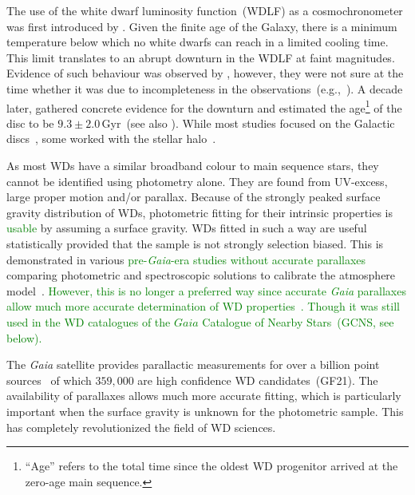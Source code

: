 \documentclass[fleqn,usenatbib]{mnras}
\begin{document}
The use of the white dwarf luminosity function~(WDLF) as a cosmochronometer was
first introduced by \citet{1959ApJ...129..243S}. Given the finite age of the
Galaxy, there is a minimum temperature below which no white dwarfs can reach in
a limited cooling time. This limit translates to an abrupt downturn in the WDLF
at faint magnitudes. Evidence of such behaviour was observed by
\citet{1979ApJ...233..226L}, however, they were not sure at the time whether it
was due to incompleteness in the observations~(e.g.,~\citealp{1984ApJ...282..615I}). A decade later,
\citet{1987ApJ...315L..77W} gathered concrete evidence for the downturn and
estimated the age\footnote{``Age'' refers to the total time since the oldest
WD progenitor arrived at the zero-age main sequence.} of the disc to be
$9.3 \pm 2.0$\,Gyr~(see also \citealt{1988ApJ...332..891L}). While most studies
focused on the Galactic discs~\citep{1989LNP...328...15L, 1992ApJ...386..539W,
1995LNP...443...24O, 1998ApJ...497..294L, 1999MNRAS.306..736K,
2012ApJS..199...29G, 2021A&A...649A...6G}, some worked with the stellar
halo~\citep{2006AJ....131..571H, 2011MNRAS.417...93R, 2017AJ....153...10M,
2019MNRAS.482..715L, 2021MNRAS.502.1753T}.
 
As most WDs have a similar broadband colour to main sequence stars, they cannot be
identified using photometry alone. They are found from UV-excess, large
proper motion and/or parallax. Because of the strongly peaked surface gravity
distribution of WDs, photometric fitting for their intrinsic properties
is \textcolor{green}{usable} by assuming a surface gravity. WDs fitted in such a way are useful
statistically provided that the sample is not strongly selection biased. This
is demonstrated in various \textcolor{green}{pre-\textit{Gaia}-era studies without accurate parallaxes}
comparing photometric and spectroscopic solutions to calibrate the atmosphere
model~\citep{2019ApJ...871..169G, 2019ApJ...882..106G}. \textcolor{green}{However,
this is no longer a preferred way since accurate \textit{Gaia} parallaxes allow
much more accurate determination of WD properties~\citep[e.g.][hereafter, GF21]{2021MNRAS.508.3877G}. Though it was still used in the WD catalogues of the
$Gaia$ Catalogue of Nearby Stars~(GCNS, see below).}

The \textit{Gaia} satellite provides parallactic measurements for over a billion point
sources~\citep{2021A&A...649A...1G, 2021AJ....161..147B} of which $359,000$
are high confidence WD candidates~(GF21).
The availability of parallaxes allows much more accurate fitting, which is
particularly important when the surface gravity is unknown for the photometric
sample. This has completely revolutionized the field of WD sciences. 
\end{document}
